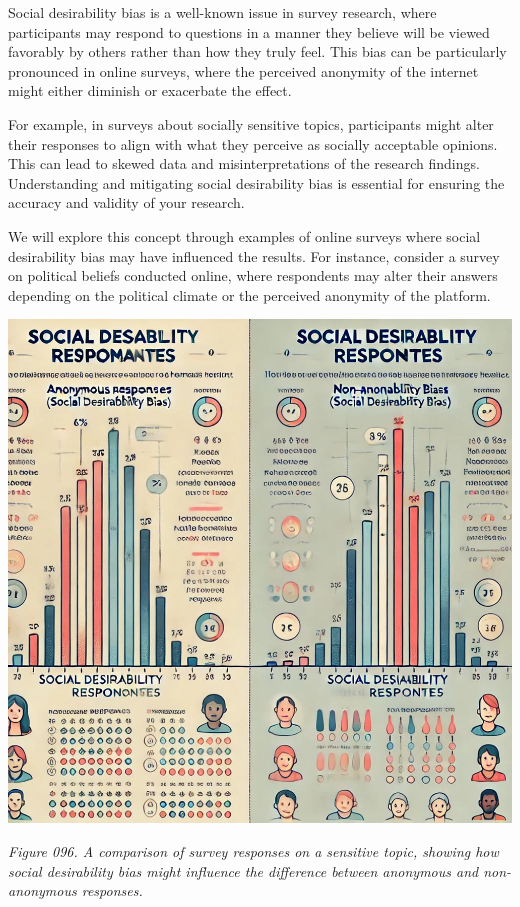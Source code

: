 \documentclass[
]{book}
\begin{document}
Social desirability bias is a well-known issue in survey research, where participants may respond to questions in a manner they believe will be viewed favorably by others rather than how they truly feel. This bias can be particularly pronounced in online surveys, where the perceived anonymity of the internet might either diminish or exacerbate the effect.

For example, in surveys about socially sensitive topics, participants might alter their responses to align with what they perceive as socially acceptable opinions. This can lead to skewed data and misinterpretations of the research findings. Understanding and mitigating social desirability bias is essential for ensuring the accuracy and validity of your research.

We will explore this concept through examples of online surveys where social desirability bias may have influenced the results. For instance, consider a survey on political beliefs conducted online, where respondents may alter their answers depending on the political climate or the perceived anonymity of the platform.

\includegraphics[width=1\linewidth,height=\textheight,keepaspectratio]{images/fig096.jpg}

\emph{Figure 096. A comparison of survey responses on a sensitive topic, showing how social desirability bias might influence the difference between anonymous and non-anonymous responses.}
\end{document}
